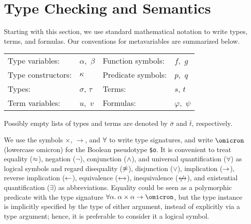 \section{Type Checking and Semantics} \label{sec_semantics}

 Starting with this section, we use standard
mathematical notation to write types, terms, and formulas. Our conventions
for metavariables are summarized below.
%
\begin{center}
\begin{tabular}{l@{\enskip}l@{\qquad\quad}l@{\enskip}l}
Type variables: & $\alpha,$ $\beta$ &
  Function symbols: & $f,$ $g$ \\
Type constructors: & $\kappa$ &
  Predicate symbols: & $p,$ $q$ \\
Types: & $\sigma$, $\tau$ &
  Terms: & $s$, $t$ \\
Term variables: & $u,$ $v$ &
  Formulas: & $\varphi,$ $\psi$
\end{tabular}
\end{center}
%
Possibly empty lists of types and terms are denoted by $\bar{\sigma}$ and
$\bar{t}$, respectively.

We use the symbols ${\times}$, ${\to}$, and ${\forall}$
to write type signatures, and write $\omicron$ (lowercase omicron) for the
Boolean pseudotype {\tt \$o}. It is convenient to treat
equality ($\approx$), negation ($\lnot$), conjunction ($\mathrel{\land}$), and universal
quantification ($\forall$) as logical symbols and regard disequality
($\not\approx$), disjunction ($\lor$), implication ($\rightarrow$), reverse implication
($\leftarrow$), equivalence ($\leftarrow\kern-1.75ex\rightarrow$), inequivalence ($\kern.4875ex\not\kern-.4875ex\leftarrow\kern-1.75ex\rightarrow$), and existential
quantification ($\exists$) as abbreviations.
%
Equality could be seen as a polymorphic predicate with the type signature
$\forall\alpha.\mskip4.5mu \alpha\times\alpha\to\omicron$, but the type instance is
implicitly specified by the type of either argument, instead of explicitly via a
type argument; hence, it is preferable to consider it a logical symbol.

